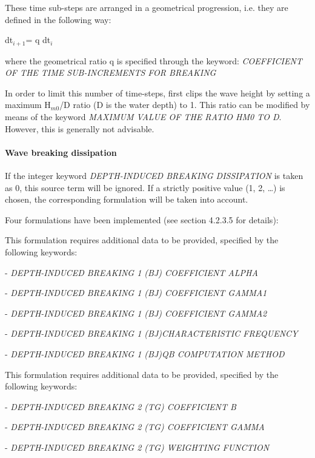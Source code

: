  These time sub-steps are arranged in a geometrical progression, i.e. they are defined in the following way:

dt${}_{i+1 }$= q dt${}_{i}$

 where the geometrical ratio q is specified through the keyword: \textit{COEFFICIENT OF THE TIME SUB-INCREMENTS FOR BREAKING}

 In order to limit this number of time-steps, \tomawac first clips the wave height by setting a maximum H${}_{m0}$/D ratio (D is the water depth) to 1. This ratio can be modified by means of the keyword \textit{MAXIMUM VALUE OF THE RATIO HM0 TO D}. However, this is generally not advisable.


\paragraph{ Wave breaking dissipation}

 If the integer keyword \textit{DEPTH-INDUCED BREAKING DISSIPATION} is taken as 0, this source term will be ignored. If a strictly positive value (1, 2, \dots ) is chosen, the corresponding formulation will be taken into account.

 Four formulations have been implemented (see section 4.2.3.5 for details):

 \textbf{}

 This formulation requires additional data to be provided, specified by the following keywords:

 - \textit{DEPTH-INDUCED BREAKING 1 (BJ) COEFFICIENT ALPHA}

 - \textit{DEPTH-INDUCED BREAKING 1 (BJ) COEFFICIENT GAMMA1}

 - \textit{DEPTH-INDUCED BREAKING 1 (BJ) COEFFICIENT GAMMA2}

 - \textit{DEPTH-INDUCED BREAKING 1 (BJ)CHARACTERISTIC FREQUENCY }

 - \textit{DEPTH-INDUCED BREAKING 1 (BJ)QB COMPUTATION METHOD}

 \textit{}

 \textbf{}

 This formulation requires additional data to be provided, specified by the following keywords:

 - \textit{DEPTH-INDUCED BREAKING 2 (TG) COEFFICIENT B}

 - \textit{DEPTH-INDUCED BREAKING 2 (TG) COEFFICIENT GAMMA}

 - \textit{DEPTH-INDUCED BREAKING 2 (TG) WEIGHTING FUNCTION}

